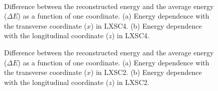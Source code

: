 \begin{figure}[!htb]
	\centering			
		\\
	\caption{\label{fig.energyDep4} Difference between the reconstructed energy and the average energy ($\Delta E$) as a function of one coordinate. (a) Energy dependence with the transverse coordinate ($x$) in LXSC4. (b) Energy dependence with the longitudinal coordinate ($z$) in LXSC4.}
\end{figure}		


\begin{figure}[!htb]
	\centering		
	\caption{\label{fig.energyDep2} Difference between the reconstructed energy and the average energy ($\Delta E$) as a function of one coordinate. (a) Energy dependence with the transverse coordinate ($x$) in LXSC2. (b) Energy dependence with the longitudinal coordinate ($z$) in LXSC2.}
\end{figure}

